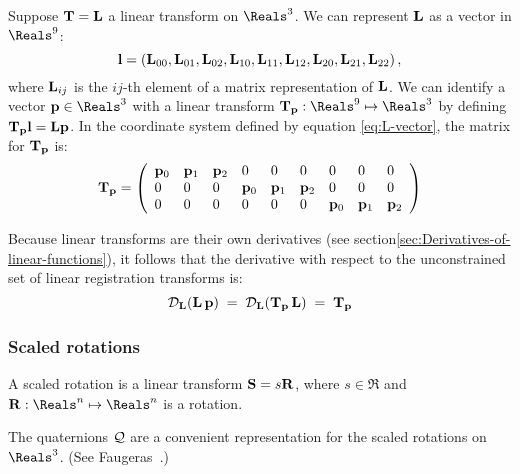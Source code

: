 Suppose ${\mathbf T} = {\mathbf L}$ a linear transform on $\Reals^3$.
We can represent ${\mathbf L}$ as a vector in $\Reals^9$:
\begin{equation}
\label{eq:L-vector}
{\mathbf l} = \left({\mathbf L}_{00},{\mathbf L}_{01},{\mathbf L}_{02},
       {\mathbf L}_{10},{\mathbf L}_{11},{\mathbf L}_{12},
       {\mathbf L}_{20},{\mathbf L}_{21},{\mathbf L}_{22}\right),
\end{equation}
where ${\mathbf L}_{ij}$ is the $ij$-th element of a
matrix representation of ${\mathbf L}$.
We can identify a vector $\p \in \Reals^3$
with a linear transform $\Tr_{\p} : \Reals^9 \mapsto \Reals^3$
by defining ${\mathbf T}_{{\mathbf p}}{\mathbf l} = {\mathbf L}{\mathbf p}$.
In the coordinate system defined by equation \ref{eq:L-vector},
the matrix for ${\mathbf T}_{{\mathbf p}}$ is:
\begin{equation}
\label{eq:Tp-matrix}
{\mathbf T}_{{\mathbf p}} =
\left(
\begin{array}{lllllllll}
{\mathbf p}_0 & {\mathbf p}_1 & {\mathbf p}_2 &  0   &  0   &  0   &  0   &  0   &  0 \\
 0   &  0   &  0   & {\mathbf p}_0 & {\mathbf p}_1 & {\mathbf p}_2 &  0   &  0   &  0 \\
 0   &  0   &  0   &  0   &  0   &  0   & {\mathbf p}_0 & {\mathbf p}_1 & {\mathbf p}_2 \\
\end{array}
\right)
\end{equation}

Because linear transforms are their own derivatives
(see section\ref{sec:Derivatives-of-linear-functions}),
it follows that the derivative with respect to the
unconstrained set of linear registration transforms is:
\begin{equation}
\label{eq:linear-transform-derivative}
{\mathcal D}_{{\mathbf L}}{\left( {\mathbf L} \, {\mathbf p} \right)}
 \; = \;
{\mathcal D}_{{\mathbf L}}{\left( {\mathbf T}_{{\mathbf p}} \, {\mathbf L} \right)}
 \; = \;
{\mathbf T}_{{\mathbf p}}
\end{equation}

\subsubsection{Scaled rotations}
\label{sec:Scaled-rotations}

A scaled rotation
is a linear transform ${\mathbf S} = s {\mathbf R}$,
where $s \in \Re$ and $\R : \Reals^n \mapsto \Reals^n$
is a rotation.

The quaternions $\mathcal{Q}$ are a convenient representation
for the scaled rotations on $\Reals^3$.
(See Faugeras~\cite[sec.~5.5.2]{Faugeras1993}.)

